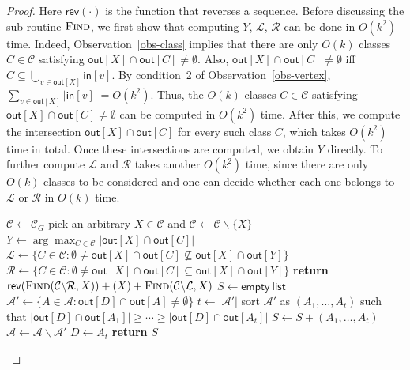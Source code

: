 \begin{proof}
Here $\mathsf{rev}(\cdot)$ is the function that reverses a sequence.
Before discussing the sub-routine $\textsc{Find}$, we first show that computing $Y$, $\mathcal{L}$, $\mathcal{R}$ can be done in $O(k^2)$ time.
Indeed, Observation~\ref{obs-class} implies that there are only $O(k)$ classes $C \in \mathcal{C}$ satisfying $\mathsf{out}[X] \cap \mathsf{out}[C] \neq \emptyset$.
Also, $\mathsf{out}[X] \cap \mathsf{out}[C] \neq \emptyset$ iff $C \subseteq \bigcup_{v \in \mathsf{out}[X]} \mathsf{in}[v]$.
By condition~2 of Observation~\ref{obs-vertex}, $\sum_{v \in \mathsf{out}[X]} |\mathsf{in}[v]| = O(k^2)$.
Thus, the $O(k)$ classes $C \in \mathcal{C}$ satisfying $\mathsf{out}[X] \cap \mathsf{out}[C] \neq \emptyset$ can be computed in $O(k^2)$ time.
After this, we compute the intersection $\mathsf{out}[X] \cap \mathsf{out}[C]$ for every such class $C$, which takes $O(k^2)$ time in total.
Once these intersections are computed, we obtain $Y$ directly.
To further compute $\mathcal{L}$ and $\mathcal{R}$ takes another $O(k^2)$ time, since there are only $O(k)$ classes to be considered and one can decide whether each one belongs to $\mathcal{L}$ or $\mathcal{R}$ in $O(k)$ time.

\begin{algorithm}
    \caption{\textsc{ClassOrder}$(G,\mathcal{C}_G)$}
    \begin{algorithmic}[1]
        \State $\mathcal{C} \leftarrow \mathcal{C}_G$
        \State pick an arbitrary $X \in \mathcal{C}$ and $\mathcal{C} \leftarrow \mathcal{C} \backslash \{X\}$
        \State $Y \leftarrow \arg\max_{C \in \mathcal{C}} |\mathsf{out}[X] \cap \mathsf{out}[C]|$
        \State $\mathcal{L} \leftarrow \{C \in \mathcal{C}: \emptyset \neq \mathsf{out}[X] \cap \mathsf{out}[C] \nsubseteq \mathsf{out}[X] \cap \mathsf{out}[Y]\}$
        \State $\mathcal{R} \leftarrow \{C \in \mathcal{C}: \emptyset \neq \mathsf{out}[X] \cap \mathsf{out}[C] \subseteq \mathsf{out}[X] \cap \mathsf{out}[Y]\}$       
        \State \textbf{return} $\mathsf{rev}(\textsc{Find}(\mathcal{C} \backslash \mathcal{R},X))+(X)+\textsc{Find}(\mathcal{C} \backslash \mathcal{L},X)$
        \medskip
            \State $S \leftarrow \mathsf{empty\ list}$
                \State $\mathcal{A}' \leftarrow \{A \in \mathcal{A}: \mathsf{out}[D] \cap \mathsf{out}[A] \neq \emptyset\}$
                \State $t \leftarrow |\mathcal{A}'|$
                \EndIf                
                \State sort $\mathcal{A}'$ as $(A_1,\dots,A_t)$ such that $|\mathsf{out}[D] \cap \mathsf{out}[A_1]| \geq \cdots \geq |\mathsf{out}[D] \cap \mathsf{out}[A_t]|$
                \State $S \leftarrow S + (A_1,\dots,A_t)$
                \State $\mathcal{A} \leftarrow \mathcal{A} \backslash \mathcal{A}'$
                \State $D \leftarrow A_t$
            \EndWhile
            \State \textbf{return} $S$
        \EndFunction
    \end{algorithmic}
    \label{alg-classorder}
\end{algorithm}


\end{proof}
